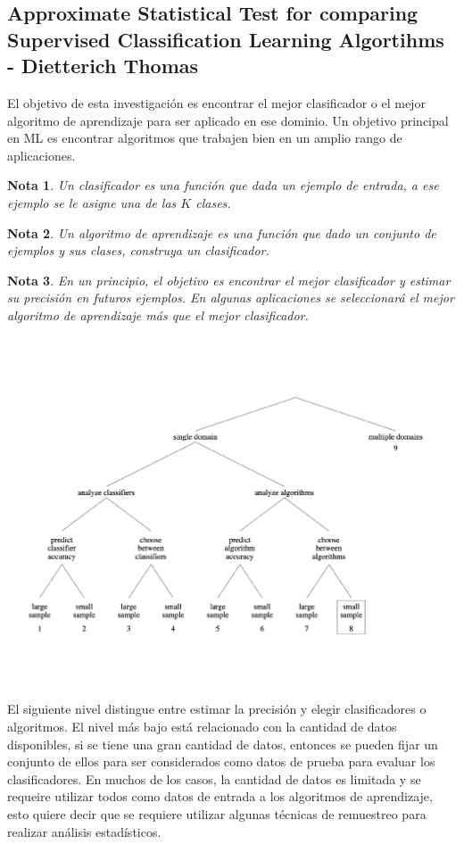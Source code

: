 \documentclass[12pt]{article}
\newtheorem{Note}{Nota}%
\begin{document}
\subsection{Approximate Statistical Test for comparing Supervised Classification Learning Algortihms - Dietterich Thomas}

El objetivo  de esta investigaci\'on es encontrar el mejor clasificador o el mejor algoritmo de aprendizaje para ser aplicado en ese dominio. Un objetivo principal en ML es encontrar algoritmos que trabajen bien en un amplio rango de aplicaciones.

\begin{Note}
Un clasificador es una funci\'on que dada un ejemplo de entrada,  a ese ejemplo se le asigne una de las $K$ clases.
\end{Note}


\begin{Note}
Un algoritmo de aprendizaje es una funci\'on  que dado un conjunto de ejemplos y sus clases, construya un clasificador.
\end{Note}

\begin{Note}
En un principio, el objetivo es encontrar el mejor clasificador y estimar su precisi\'on en futuros ejemplos.  En algunas aplicaciones se seleccionar\'a el mejor algoritmo de aprendizaje m\'as que el mejor clasificador.
\end{Note}

\includegraphics[scale=.5]{TaxonomicalQuestion.pdf} 

El siguiente nivel distingue entre estimar la precisi\'on y elegir clasificadores o algoritmos. El nivel m\'as bajo est\'a relacionado con la cantidad de datos disponibles, si se tiene una gran cantidad de datos, entonces se pueden fijar un conjunto de ellos para ser considerados como datos de prueba para evaluar los clasificadores. En muchos de los casos, la cantidad de datos es limitada y se requeire utilizar todos como datos de entrada a los algoritmos de aprendizaje, esto quiere decir que se requiere utilizar algunas t\'ecnicas de remuestreo para realizar an\'alisis estad\'isticos.
\end{document}
